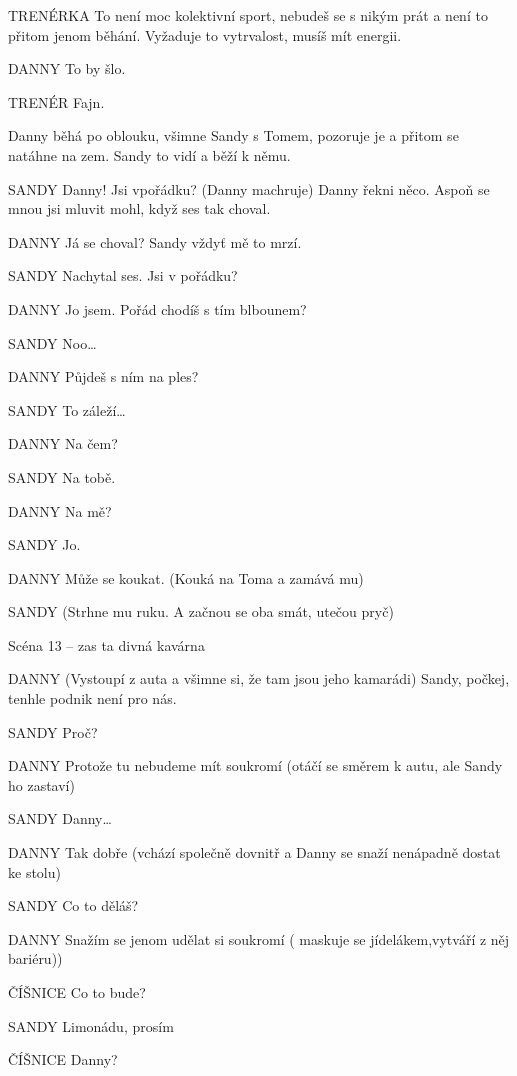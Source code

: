 TRENÉRKA          To není moc kolektivní sport, nebudeš se s nikým prát a není to přitom         jenom běhání. Vyžaduje to vytrvalost, musíš mít energii. 

DANNY        To by šlo. 

TRENÉR        Fajn. 

Danny běhá po oblouku, všimne Sandy s Tomem, pozoruje je a přitom se natáhne na zem. Sandy to vidí a běží k němu. 

SANDY        Danny! Jsi vpořádku? (Danny machruje) Danny řekni něco.  Aspoň se         mnou jsi mluvit mohl, když ses tak choval. 

DANNY        Já se choval? Sandy vždyť mě to mrzí. 

SANDY        Nachytal ses.  Jsi v pořádku? 

DANNY        Jo jsem. Pořád chodíš s tím blbounem? 

SANDY        Noo…

DANNY        Půjdeš s ním na ples? 

SANDY        To záleží…

DANNY        Na čem? 

SANDY        Na tobě. 

DANNY        Na mě? 

SANDY        Jo. 

DANNY        Může se koukat. (Kouká na Toma a zamává mu)

SANDY        (Strhne mu ruku. A začnou se oba smát, utečou pryč) 

Scéna 13 – zas ta divná kavárna 

DANNY         (Vystoupí z auta a všimne si, že tam jsou jeho kamarádi) Sandy, počkej,           tenhle podnik není pro nás. 

SANDY         Proč? 

DANNY        Protože tu nebudeme mít soukromí (otáčí se směrem k autu, ale Sandy         ho zastaví) 

SANDY        Danny… 

DANNY         Tak dobře (vchází společně dovnitř a Danny se snaží nenápadně dostat         ke stolu) 

SANDY         Co to děláš? 

DANNY         Snažím se jenom udělat si soukromí ( maskuje se jídelákem,vytváří z něj bariéru))

ČÍŠNICE         Co to bude? 

SANDY        Limonádu, prosím 

ČÍŠNICE         Danny? 

